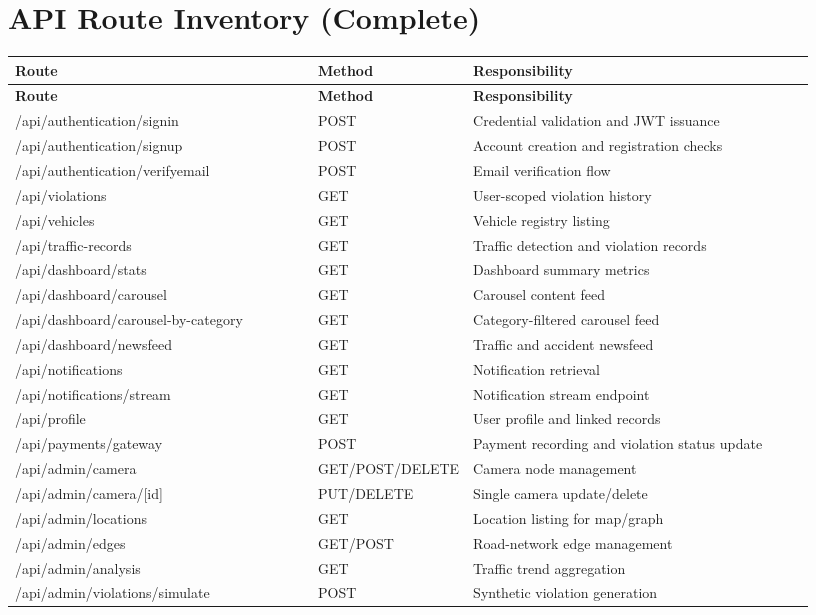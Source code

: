 \documentclass[12pt]{article}
\begin{document}
\section{API Route Inventory (Complete)}
\begin{longtable}{p{0.38\linewidth} p{0.12\linewidth} p{0.43\linewidth}}
\toprule
\textbf{Route} & \textbf{Method} & \textbf{Responsibility} \\
\midrule
\endfirsthead
\toprule
\textbf{Route} & \textbf{Method} & \textbf{Responsibility} \\
\midrule
\endhead
/api/authentication/signin & POST & Credential validation and JWT issuance \\
/api/authentication/signup & POST & Account creation and registration checks \\
/api/authentication/verifyemail & POST & Email verification flow \\
/api/violations & GET & User-scoped violation history \\
/api/vehicles & GET & Vehicle registry listing \\
/api/traffic-records & GET & Traffic detection and violation records \\
/api/dashboard/stats & GET & Dashboard summary metrics \\
/api/dashboard/carousel & GET & Carousel content feed \\
/api/dashboard/carousel-by-category & GET & Category-filtered carousel feed \\
/api/dashboard/newsfeed & GET & Traffic and accident newsfeed \\
/api/notifications & GET & Notification retrieval \\
/api/notifications/stream & GET & Notification stream endpoint \\
/api/profile & GET & User profile and linked records \\
/api/payments/gateway & POST & Payment recording and violation status update \\
/api/admin/camera & GET/POST/DELETE & Camera node management \\
/api/admin/camera/[id] & PUT/DELETE & Single camera update/delete \\
/api/admin/locations & GET & Location listing for map/graph \\
/api/admin/edges & GET/POST & Road-network edge management \\
/api/admin/analysis & GET & Traffic trend aggregation \\
/api/admin/violations/simulate & POST & Synthetic violation generation \\

\end{longtable}
\end{document}
